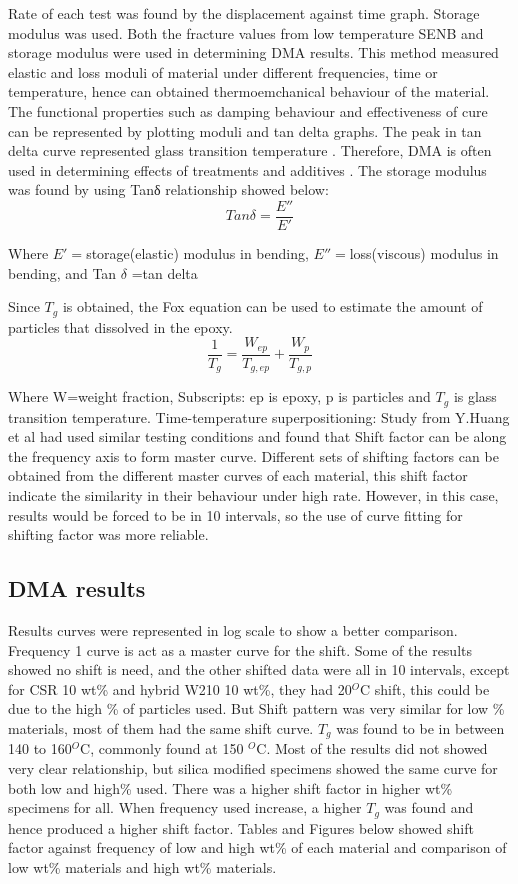 \documentclass[numbers=noendperiod,chapterprefix=on]{icldt} %
\begin{document}
{Rate of each test was found by the displacement against time graph. Storage modulus was used. Both the fracture values from low temperature SENB and storage modulus were used in determining DMA results.
This method measured elastic and loss moduli of material under different frequencies, time or temperature, hence can obtained thermoemchanical behaviour of the material. The functional properties such as damping behaviour and effectiveness of cure can be represented by plotting moduli and tan delta graphs. The peak in tan delta curve represented glass transition temperature \cite{D50232007}. Therefore, DMA is often used in determining effects of treatments and additives \cite{D50232007}.
The storage modulus was found by using Tanδ relationship showed below:
\begin{equation} 
Tan\delta=\frac{E''}{E'}
\end{equation}

Where $E'=$storage(elastic) modulus in bending,
$E''=$loss(viscous) modulus in bending,
 and
Tan $\delta$ =tan delta

Since $T_g$ is obtained, the Fox equation can be used to estimate the amount of particles that dissolved in the epoxy.
\begin{equation} 
\frac{1}{T_g}=\frac{W_{ep}}{T_{g,ep}} + \frac{W_p}{T_{g,p}} 
\end{equation}

Where W=weight fraction,
Subscripts: ep is epoxy, p is particles
and $ T_{g} $ is glass transition temperature.
\newline
Time-temperature superpositioning:
Study from Y.Huang et al \cite{Huang1993} had used similar testing conditions and found that Shift factor can be along the frequency axis to form master curve.
Different sets of shifting factors can be obtained from the different master curves of each material, this shift factor indicate the similarity in their behaviour under high rate.
However, in this case, results would be forced to be in 10 intervals, so the use of curve fitting for shifting factor was more reliable.

\subsection{DMA results}
Results curves were represented in log scale to show a better comparison. Frequency 1 curve is act as a master curve for the shift. Some of the results showed no shift is need, and the other shifted data were all in 10 intervals, except for CSR 10 wt\% and hybrid W210 10 wt\%, they had 20$^O$C shift, this could be due to the high \% of particles used. But Shift pattern was very similar for low \% materials, most of them had the same shift curve. $ T_{g} $ was found to be in between 140 to 160$^O$C, commonly found at 150 $^O$C.
Most of the results did not showed very clear relationship, but silica modified specimens showed the same curve for both low and high\% used. There was a higher shift factor in higher wt\% specimens for all. When frequency used increase, a higher $T_g$ was found and hence produced a higher shift factor.
Tables and Figures below showed shift factor against frequency of low and high wt\% of each material and comparison of low wt\% materials and high wt\% materials.

}
\end{document}
